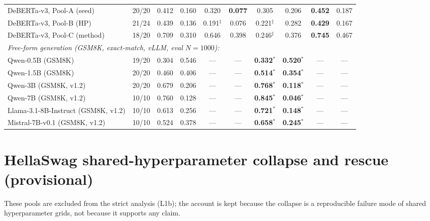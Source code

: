 \documentclass[11pt]{article}
\begin{document}
\begin{table}[t]
\begin{tabular}{ll|cc|cc|cc|cc}
\quad DeBERTa-v3, Pool-A (seed)        & 20/20 & 0.412 & 0.160 & 0.320 & \textbf{0.077} & 0.305 & 0.206 & \textbf{0.452} & 0.187 \\
\quad DeBERTa-v3, Pool-B (HP)          & 21/24 & 0.439 & 0.136 & 0.191$^{\ddagger}$ & 0.076 & 0.221$^{\ddagger}$ & 0.282 & \textbf{0.429} & 0.167 \\
\quad DeBERTa-v3, Pool-C (method)      & 18/20 & 0.709 & 0.310 & 0.646 & 0.398 & 0.246$^{\ddagger}$ & 0.376 & \textbf{0.745} & 0.467 \\
\midrule
\multicolumn{10}{l}{\emph{Free-form generation (GSM8K, exact-match, vLLM, eval $N{=}1000$):}} \\
\quad Qwen-0.5B (GSM8K)                & 19/20 & 0.304 & 0.546 & --- & --- & \textbf{0.332}$^{*}$ & \textbf{0.520}$^{*}$ & --- & --- \\
\quad Qwen-1.5B (GSM8K)                & 20/20 & 0.460 & 0.406 & --- & --- & \textbf{0.514}$^{*}$ & \textbf{0.354}$^{*}$ & --- & --- \\
\quad Qwen-3B (GSM8K, v1.2)            & 20/20 & 0.679 & 0.206 & --- & --- & \textbf{0.768}$^{*}$ & \textbf{0.118}$^{*}$ & --- & --- \\
\quad Qwen-7B (GSM8K, v1.2)            & 10/10 & 0.760 & 0.128 & --- & --- & \textbf{0.845}$^{*}$ & \textbf{0.046}$^{*}$ & --- & --- \\
\quad Llama-3.1-8B-Instruct (GSM8K, v1.2) & 10/10 & 0.613 & 0.256 & --- & --- & \textbf{0.721}$^{*}$ & \textbf{0.148}$^{*}$ & --- & --- \\
\quad Mistral-7B-v0.1 (GSM8K, v1.2)     & 10/10 & 0.524 & 0.378 & --- & --- & \textbf{0.658}$^{*}$ & \textbf{0.245}$^{*}$ & --- & --- \\
\bottomrule
\end{tabular}
\end{table}


\section{HellaSwag shared-hyperparameter collapse and rescue (provisional)}\label{app:hellaswag}
These pools are excluded from the strict analysis (L1b); the account is kept because the collapse is a
reproducible failure mode of shared hyperparameter grids, not because it supports any claim.
\end{document}

